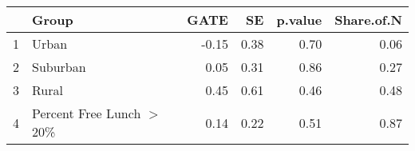 \begin{tabular}{rlrrrr}
  \hline
 & Group & GATE & SE & p.value & Share.of.N \\ 
  \hline
1 & Urban & -0.15 & 0.38 & 0.70 & 0.06 \\ 
  2 & Suburban & 0.05 & 0.31 & 0.86 & 0.27 \\ 
  3 & Rural & 0.45 & 0.61 & 0.46 & 0.48 \\ 
  4 & Percent Free Lunch $>$ 20\% & 0.14 & 0.22 & 0.51 & 0.87 \\ 
   \hline
\end{tabular}
